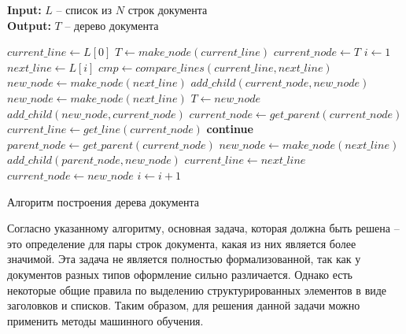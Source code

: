 \begin{algorithm}
    \hspace*{\algorithmicindent} \textbf{Input:} $L$ -- список из $N$ строк документа \\
    \hspace*{\algorithmicindent} \textbf{Output:} $T$ -- дерево документа
    \begin{algorithmic}
        \State $current\_line \gets L[0]$
        \State $T \gets make\_node(current\_line)$ 
        \State $current\_node \gets T$
        \State $i \gets 1$
            \State $next\_line \gets L[i]$
            \State $cmp \gets compare\_lines(current\_line, next\_line)$ 
             
                \State $new\_node \gets make\_node(next\_line)$
                \State $add\_child(current\_node, new\_node)$
             
                    \State $new\_node \gets make\_node(next\_line)$
                    \State $T \gets new\_node$
                    \State $add\_child(new\_node, current\_node)$
                \Else
                    \State $current\_node \gets get\_parent(current\_node)$
                    \State $current\_line \gets get\_line(current\_node)$
                    \State \textbf{continue}
                \EndIf
            \Else {}
                \State $parent\_node \gets get\_parent(current\_node)$
                \State $new\_node \gets make\_node(next\_line)$
                \State $add\_child(parent\_node, new\_node)$
            \EndIf
            \State $current\_line \gets next\_line$
            \State $current\_node \gets new\_node$
            \State $i \gets i + 1$
        \EndWhile
    \end{algorithmic}
    \caption{Алгоритм построения дерева документа}
    \label{alg:treebuilding}
\end{algorithm}

Согласно указанному алгоритму, основная задача, которая должна быть решена -- это определение для пары строк документа, какая из них является более значимой.
Эта задача не является полностью формализованной, так как у документов разных типов оформление сильно различается.
Однако есть некоторые общие правила по выделению структурированных элементов в виде заголовков и списков.
Таким образом, для решения данной задачи можно применить методы машинного обучения.

